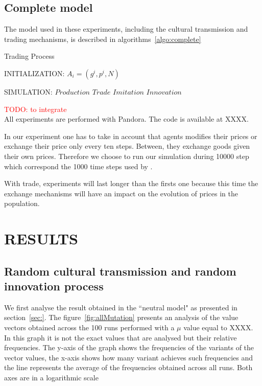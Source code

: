 \documentclass{wscpaperproc}
\newcommand{\memo}[2]{\textcolor{#1}{#2}}
\newcommand{\todo}[1]{\memo{red}{TODO: #1\\}}
\begin{document}
\subsection{Complete model}

The model used in these experiments, including the cultural transmission and trading mechanisms, is described in algorithms~\ref{algo:complete}

\begin{algorithm}
\caption{Trading Process}
\label{algo:complete}
	\begin{algorithmic}[1]
	\scriptsize
	\State INITIALIZATION: 
				\State $A_i = (g^i,p^i, N)$ 
			\EndFor
		\EndFor

	\State SIMULATION:
				\State $Production$
				\State $Trade$				
					\State $Imitation$
					\State $Innovation$
				\EndIf
			\EndFor
		\EndLoop
\end{algorithmic}
\end{algorithm}

\todo{to integrate}
All experiments are performed with Pandora. The code is available at XXXX.

In our experiment one has to take in account that agents modifies their prices or exchange their price only every ten steps. Between, they exchange goods given their own prices. Therefore we choose to run our simulation during 10000 step which correspond the 1000 time steps used by \cite{bentley_random_2004,mesoudi_random_2009}.

With trade, experiments will last longer than the firsts one because this time the exchange mechanisms will have an impact on the evolution of prices in the population. 


\section{RESULTS}
\subsection{Random cultural transmission and random innovation process}

We first analyse the result obtained in the ``neutral model" as presented in section~\ref{sec:}. The figure~\ref{fig:allMutation} presents an analysis of the value vectors obtained across the 100 runs performed with a $\mu$ value equal to XXXX. In this graph it is not the exact values that are analysed but their relative frequencies. The y-axis of the graph shows the frequencies of the variants of the vector values, the x-axis shows how many variant achieves such frequencies and the line represents the average of the frequencies obtained across all runs. Both axes are in a logarithmic scale
\end{document}
